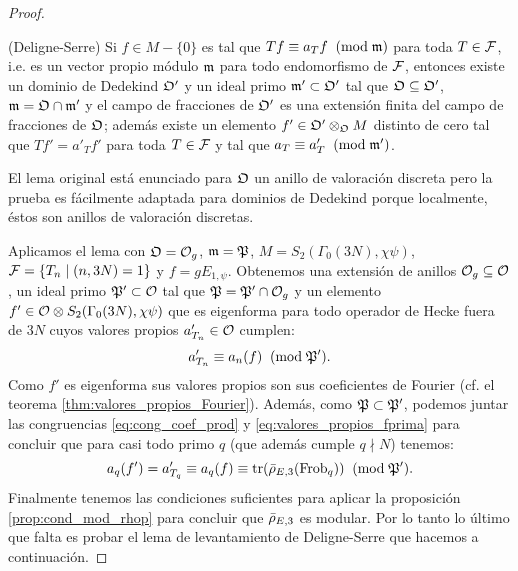 \begin{proof}
\begin{lema}\label{lema:deligne_serre}%
(Deligne-Serre) Si $f\in M-\{0\}$ es tal que $Tf\equiv a_Tf\;\;(\mathrm{mod}\; \mathfrak{m})$ para toda $T\in\mathcal{F}$, i.e. es un vector propio m\'odulo $\mathfrak{m}$ para todo endomorfismo de $\mathcal{F}$, entonces existe un dominio de Dedekind $\mathfrak{O}'$ y un ideal primo $\mathfrak{m}'\subset\mathfrak{O}'$ tal que $\mathfrak{O}\subseteq\mathfrak{O}'$, $\mathfrak{m}=\mathfrak{O}\cap\mathfrak{m}'$ y el campo de fracciones de $\mathfrak{O}'$ es una extensi\'on finita del campo de fracciones de $\mathfrak{O}$; adem\'as existe un elemento $f'\in\mathfrak{O}'\otimes_{\mathfrak{O}}M$ distinto de cero tal que $Tf'=a'_{T}f'$ para toda $T\in\mathcal{F}$ y tal que $a_T\equiv a'_T\;\;(\mathrm{mod}\; \mathfrak{m}')$.
\end{lema}%

\begin{nota}
  El lema original est\'a enunciado para $\mathfrak{O}$ un anillo de valoraci\'on discreta pero la prueba es f\'acilmente adaptada para dominios de Dedekind porque localmente, éstos son anillos de valoración discretas.  
\end{nota}

Aplicamos el lema con $\mathfrak{O}=\mathcal{O}_g$, $\mathfrak{m}=\mathfrak{P}$, $M=S_2(\Gamma_0(3N),\chi\psi)$, $\mathcal{F}=\{T_n\mid (n,3N)=1\}$ y $f=gE_{1,\psi}$. Obtenemos una extensi\'on de  anillos $\mathcal{O}_g\subseteq\mathcal{O}$, un ideal primo $\mathfrak{P}'\subset\mathcal{O}$ tal que $\mathfrak{P}=\mathfrak{P}'\cap\mathcal{O}_g$ y un elemento $f'\in \mathcal{O}\otimes S_2(\Gamma_0(3N),\chi\psi)$ que es eigenforma para todo operador de Hecke fuera de $3N$ cuyos valores propios $a'_{T_n}\in\mathcal{O}$ cumplen:
\begin{equation}\label{eq:valores_propios_fprima}
  a'_{T_n}\equiv a_n(f) \;\;(\mathrm{mod}\; \mathfrak{P}').
\end{equation}
Como $f'$ es eigenforma sus valores propios son sus coeficientes de Fourier (cf. el teorema \ref{thm:valores_propios_Fourier}). Adem\'as, como $\mathfrak{P}\subset\mathfrak{P}'$, podemos juntar las congruencias \eqref{eq:cong_coef_prod} y \eqref{eq:valores_propios_fprima} para concluir que para casi todo primo $q$ (que adem\'as cumple $q\nmid N$) tenemos:
\[
  a_q(f')=a'_{T_q}\equiv a_q(f)\equiv\mathrm{tr}(\bar{\rho}_{E,3}(\mathrm{Frob}_q))\;\;(\mathrm{mod}\; \mathfrak{P}').
\]
Finalmente tenemos las condiciones suficientes para aplicar la proposici\'on \ref{prop:cond_mod_rhop} para concluir que $\bar{\rho}_{E,3}$ es modular. Por lo tanto lo \'ultimo que falta es probar el lema de levantamiento de Deligne-Serre que hacemos a continuaci\'on.
\end{proof}

